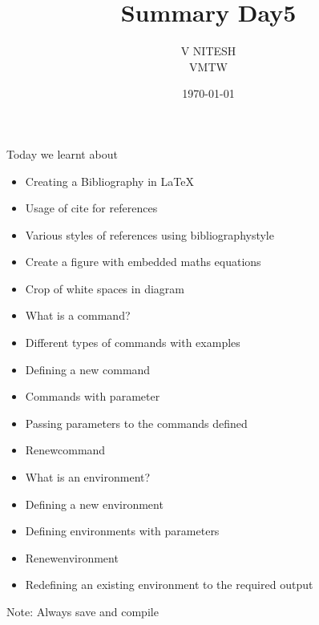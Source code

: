 \documentclass[12pt,a4paper]{article}
\title{Summary Day5}
\author{V NITESH \\ VMTW}
\date{\today}
\begin{document}
\maketitle
Today we learnt about
\begin{itemize}
\item Creating a Bibliography in LaTeX
\item Usage of cite for references
\item Various styles of references using bibliographystyle 
\item Create a figure with embedded maths equations
\item Crop of white spaces in diagram
\item What is a command? 
\item Different types of commands with examples
\item Defining a new command    
\item Commands with parameter
\item Passing parameters to the commands defined
\item Renewcommand
\item What is an environment? 
\item Defining a new environment 
\item Defining environments with parameters
\item Renewenvironment
\item Redefining an existing environment to the required output

\end{itemize}

Note: Always save and compile
\end{document}
